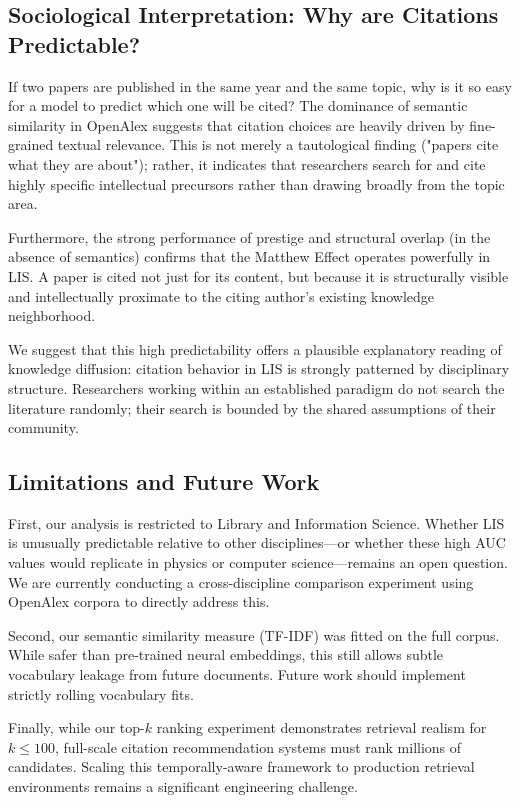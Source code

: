 \documentclass[11pt,a4paper]{article}
\begin{document}
\subsection{Sociological Interpretation: Why are Citations Predictable?}
If two papers are published in the same year and the same topic, why is it so easy for a model to predict which one will be cited? The dominance of semantic similarity in OpenAlex suggests that citation choices are heavily driven by fine-grained textual relevance. This is not merely a tautological finding ("papers cite what they are about"); rather, it indicates that researchers search for and cite highly specific intellectual precursors rather than drawing broadly from the topic area.

Furthermore, the strong performance of prestige and structural overlap (in the absence of semantics) confirms that the Matthew Effect operates powerfully in LIS. A paper is cited not just for its content, but because it is structurally visible and intellectually proximate to the citing author's existing knowledge neighborhood. 

We suggest that this high predictability offers a plausible explanatory reading of knowledge diffusion: citation behavior in LIS is strongly patterned by disciplinary structure. Researchers working within an established paradigm do not search the literature randomly; their search is bounded by the shared assumptions of their community. 

\subsection{Limitations and Future Work}
First, our analysis is restricted to Library and Information Science. Whether LIS is unusually predictable relative to other disciplines---or whether these high AUC values would replicate in physics or computer science---remains an open question. We are currently conducting a cross-discipline comparison experiment using OpenAlex corpora to directly address this.

Second, our semantic similarity measure (TF-IDF) was fitted on the full corpus. While safer than pre-trained neural embeddings, this still allows subtle vocabulary leakage from future documents. Future work should implement strictly rolling vocabulary fits. 

Finally, while our top-$k$ ranking experiment demonstrates retrieval realism for $k \le 100$, full-scale citation recommendation systems must rank millions of candidates. Scaling this temporally-aware framework to production retrieval environments remains a significant engineering challenge.
\end{document}
